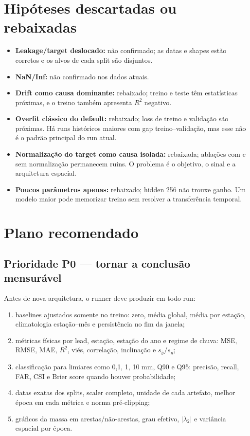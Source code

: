 \documentclass[11pt,a4paper]{article}
\begin{document}
\section{Hipóteses descartadas ou rebaixadas}

\begin{itemize}
  \item \textbf{Leakage/target deslocado:} não confirmado; as datas e shapes estão corretos e os
  alvos de cada split são disjuntos.
  \item \textbf{NaN/Inf:} não confirmado nos dados atuais.
  \item \textbf{Drift como causa dominante:} rebaixado; treino e teste têm estatísticas
  próximas, e o treino também apresenta $R^2$ negativo.
  \item \textbf{Overfit clássico do default:} rebaixado; loss de treino e validação são próximas.
  Há runs históricos maiores com gap treino--validação, mas esse não é o padrão principal do run
  atual.
  \item \textbf{Normalização do target como causa isolada:} rebaixada; ablações com e sem
  normalização permanecem ruins. O problema é o objetivo, o sinal e a arquitetura espacial.
  \item \textbf{Poucos parâmetros apenas:} rebaixado; hidden 256 não trouxe ganho. Um modelo
  maior pode memorizar treino sem resolver a transferência temporal.
\end{itemize}

\section{Plano recomendado}

\subsection{Prioridade P0 --- tornar a conclusão mensurável}

Antes de nova arquitetura, o runner deve produzir em todo run:

\begin{enumerate}
  \item baselines ajustados somente no treino: zero, média global, média por estação,
  climatologia estação--mês e persistência no fim da janela;
  \item métricas físicas por lead, estação, estação do ano e regime de chuva: MSE, RMSE, MAE,
  $R^2$, viés, correlação, inclinação e $s_{\hat y}/s_y$;
  \item classificação para limiares como 0,1, 1, 10 mm, Q90 e Q95: precisão, recall, FAR, CSI e
  Brier score quando houver probabilidade;
  \item datas exatas dos splits, scaler completo, unidade de cada artefato, melhor época em cada
  métrica e norma pré-clipping;
  \item gráficos da massa em arestas/não-arestas, grau efetivo, $|\lambda_2|$ e variância espacial
  por época.
\end{enumerate}
\end{document}
